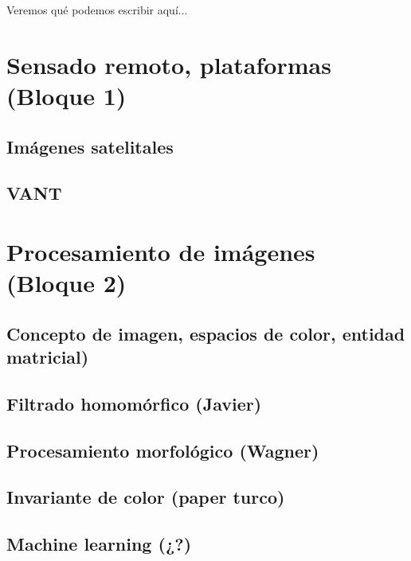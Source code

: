 Veremos qué podemos escribir aquí...
\section{Sensado remoto, plataformas (Bloque 1)}
\subsection{Imágenes satelitales}
\subsection{VANT}
\section{Procesamiento de imágenes (Bloque 2)}
\subsection{Concepto de imagen, espacios de color, entidad matricial)}
\subsection{Filtrado homomórfico (Javier)}
\subsection{Procesamiento morfológico (Wagner)}
\subsection{Invariante de color (paper turco)}
\subsection{Machine learning (¿?)}
